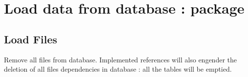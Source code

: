 \documentclass[letterpaper,10pt,english]{sphinxmanual}
\begin{document}
\begin{fulllineitems}
%
\begin{sphinxVerbatim}[commandchars=\\\{\}]
  \PYG{p}{[}\PYG{p}{]}
      
       
         

\end{sphinxVerbatim}

\end{fulllineitems}



\chapter{Load data from database :  package}
\label{\detokenize{load:load-data-from-database-load-package}}\label{\detokenize{load::doc}}

\section{Load Files}
\label{\detokenize{load:module-loacore.load.file_load}}\label{\detokenize{load:load-files}}

\begin{fulllineitems}
\label{\detokenize{load:loacore.load.file_load.clean_db}}
Remove all files from database. Implemented references will also engender the deletion of all files
dependencies in database : all the tables will be emptied.

\end{fulllineitems}

\end{document}
